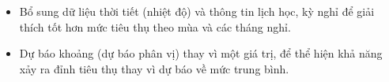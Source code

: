 \begin{itemize}
    \item Bổ sung dữ liệu thời tiết (nhiệt độ) và thông tin lịch học, kỳ nghỉ để giải thích tốt hơn mức tiêu thụ theo mùa và các tháng nghỉ.
    \item Dự báo khoảng (dự báo phân vị) thay vì một giá trị, để thể hiện khả năng xảy ra đỉnh tiêu thụ thay vì dự báo về mức trung bình.
\end{itemize}
